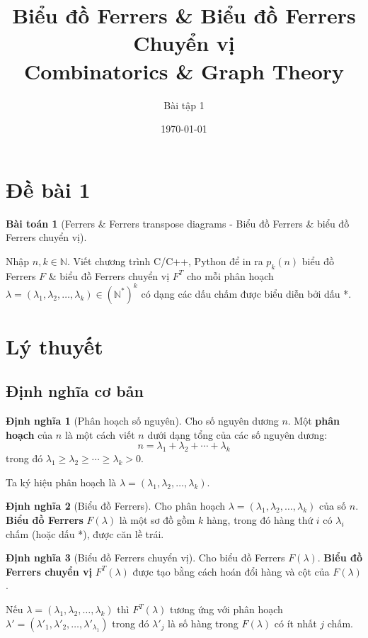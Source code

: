 \documentclass[12pt,a4paper]{article}
\title{\textbf{Biểu đồ Ferrers \& Biểu đồ Ferrers Chuyển vị}\\
\large Combinatorics \& Graph Theory}
\author{Bài tập 1}
\date{\today}
\theoremstyle{definition}
\newtheorem{definition}{Định nghĩa}
\begin{document}
\maketitle
\tableofcontents
\newpage

\section{Đề bài 1}

\textbf{Bài toán 1} (Ferrers \& Ferrers transpose diagrams - Biểu đồ Ferrers \& biểu đồ Ferrers chuyển vị). 

Nhập $n, k \in \mathbb{N}$. Viết chương trình C/C++, Python để in ra $p_k(n)$ biểu đồ Ferrers $F$ \& biểu đồ Ferrers chuyển vị $F^T$ cho mỗi phân hoạch $\lambda = (\lambda_1, \lambda_2, \ldots, \lambda_k) \in (\mathbb{N}^*)^k$ có dạng các dấu chấm được biểu diễn bởi dấu *.

\section{Lý thuyết}

\subsection{Định nghĩa cơ bản}

\begin{definition}[Phân hoạch số nguyên]
Cho số nguyên dương $n$. Một \textbf{phân hoạch} của $n$ là một cách viết $n$ dưới dạng tổng của các số nguyên dương: 
$$n = \lambda_1 + \lambda_2 + \cdots + \lambda_k$$
trong đó $\lambda_1 \geq \lambda_2 \geq \cdots \geq \lambda_k > 0$.

Ta ký hiệu phân hoạch là $\lambda = (\lambda_1, \lambda_2, \ldots, \lambda_k)$.
\end{definition}

\begin{definition}[Biểu đồ Ferrers]
Cho phân hoạch $\lambda = (\lambda_1, \lambda_2, \ldots, \lambda_k)$ của số $n$. \textbf{Biểu đồ Ferrers} $F(\lambda)$ là một sơ đồ gồm $k$ hàng, trong đó hàng thứ $i$ có $\lambda_i$ chấm (hoặc dấu *), được căn lề trái.
\end{definition}

\begin{definition}[Biểu đồ Ferrers chuyển vị]
Cho biểu đồ Ferrers $F(\lambda)$. \textbf{Biểu đồ Ferrers chuyển vị} $F^T(\lambda)$ được tạo bằng cách hoán đổi hàng và cột của $F(\lambda)$.

Nếu $\lambda = (\lambda_1, \lambda_2, \ldots, \lambda_k)$ thì $F^T(\lambda)$ tương ứng với phân hoạch $\lambda' = (\lambda'_1, \lambda'_2, \ldots, \lambda'_{\lambda_1})$ trong đó $\lambda'_j$ là số hàng trong $F(\lambda)$ có ít nhất $j$ chấm.
\end{definition}
\end{document}
